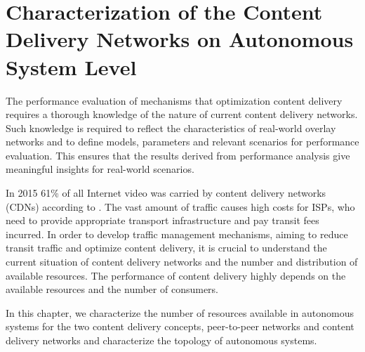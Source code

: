 \chapter{Characterization of the Content Delivery Networks on Autonomous System Level}\label{chap:aslevel}

The performance evaluation of mechanisms that optimization content delivery requires a thorough knowledge of the nature of current content delivery networks.
Such knowledge is required to reflect the characteristics of real-world overlay networks and to define models, parameters and relevant scenarios for performance evaluation.
This ensures that the results derived from performance analysis give meaningful insights for real-world scenarios.


In 2015 61\% of all Internet video was carried by content delivery networks (CDNs) according to \cite{cisco2016}.
The vast amount of traffic causes high costs for ISPs, who need to provide appropriate transport infrastructure and pay transit fees incurred.
In order to develop traffic management mechanisms, aiming to reduce transit traffic and optimize content delivery, it is crucial to understand the current situation of content delivery networks and the number and distribution of available resources.
The performance of content delivery highly depends on the available resources and the number of consumers.


In this chapter, we characterize the number of resources available in autonomous systems for the two content delivery concepts, peer-to-peer networks and content delivery networks and characterize the topology of autonomous systems.

